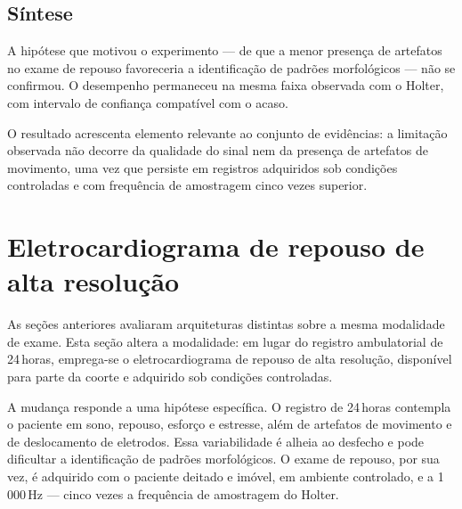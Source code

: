 \subsection{Síntese}
\label{subsec:cnnlstm-sintese}

A hipótese que motivou o experimento --- de que a menor presença de
artefatos no exame de repouso favoreceria a identificação de padrões
morfológicos --- não se confirmou. O desempenho permaneceu na mesma faixa
observada com o Holter, com intervalo de confiança compatível com o acaso.

O resultado acrescenta elemento relevante ao conjunto de evidências: a
limitação observada não decorre da qualidade do sinal nem da presença de
artefatos de movimento, uma vez que persiste em registros adquiridos sob
condições controladas e com frequência de amostragem cinco vezes superior.





%

\section{Eletrocardiograma de repouso de alta resolução}
\label{sec:resultados-cnnlstm-repouso}

As seções anteriores avaliaram arquiteturas distintas sobre a mesma
modalidade de exame. Esta seção altera a modalidade: em lugar do registro
ambulatorial de 24\,horas, emprega-se o eletrocardiograma de repouso de alta
resolução, disponível para parte da coorte e adquirido sob condições
controladas.

A mudança responde a uma hipótese específica. O registro de 24\,horas
contempla o paciente em sono, repouso, esforço e estresse, além de artefatos
de movimento e de deslocamento de eletrodos. Essa variabilidade é alheia ao
desfecho e pode dificultar a identificação de padrões morfológicos. O exame
de repouso, por sua vez, é adquirido com o paciente deitado e imóvel, em
ambiente controlado, e a 1\,000\,Hz --- cinco vezes a frequência de
amostragem do Holter.

